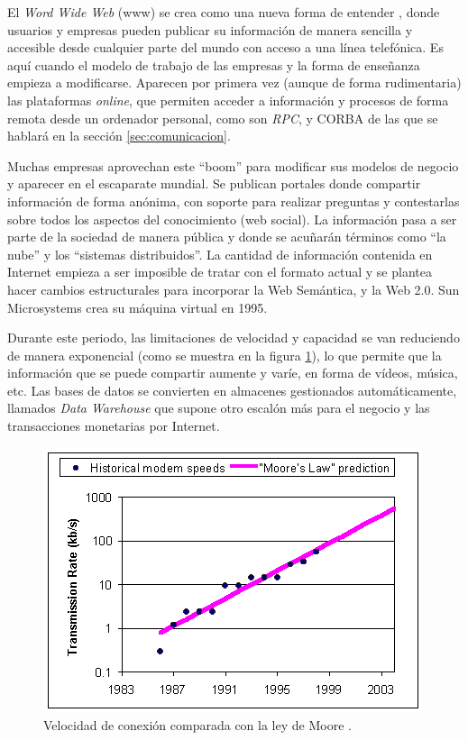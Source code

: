 El \emph{Word Wide Web} (www) se crea como una nueva forma de entender 
, donde usuarios y empresas pueden publicar su información de 
manera sencilla y accesible desde cualquier parte del mundo con acceso 
a una línea telefónica. Es aquí cuando el modelo de trabajo de las empresas 
y la forma de enseñanza empieza a modificarse. Aparecen por primera 
vez (aunque de forma rudimentaria) las plataformas 
\emph{online}, que permiten acceder a información y procesos de forma 
remota desde un ordenador personal, como son \emph{RPC}, y CORBA 
de las que se hablará en la sección \ref{sec:comunicacion}.

Muchas empresas aprovechan este ``boom'' para modificar sus modelos de 
negocio y aparecer en el escaparate mundial. Se publican portales 
donde compartir información de forma anónima, con soporte para 
realizar preguntas y contestarlas sobre todos los aspectos del 
conocimiento (web social). La información pasa a ser parte de la sociedad de manera 
pública y donde se acuñarán términos como ``la nube'' y los 
``sistemas distribuidos''. La cantidad de información contenida en 
Internet empieza a ser imposible de tratar con el formato actual y 
se plantea hacer cambios estructurales para incorporar la Web 
Semántica, y la Web 2.0. Sun Microsystems crea  su máquina 
virtual en 1995.

Durante este periodo, las limitaciones de velocidad y capacidad se van 
reduciendo de manera exponencial (como se muestra en la figura 
\ref{fig:modem-growth}), lo que permite que la información que se puede 
compartir aumente y varíe, en forma de vídeos, música, etc. Las bases 
de datos se convierten en almacenes gestionados automáticamente, 
llamados \emph{Data Warehouse} que supone otro escalón más para el 
negocio y las transacciones monetarias por Internet.

\begin{figure}
	\centering
	\includegraphics[scale=0.8]{images/modem-growth.png}
	\caption[Velocidad de conexión]{Velocidad de conexión comparada con la ley de Moore \cite{CloudComputing}.}
	\label{fig:modem-growth}
\end{figure}

